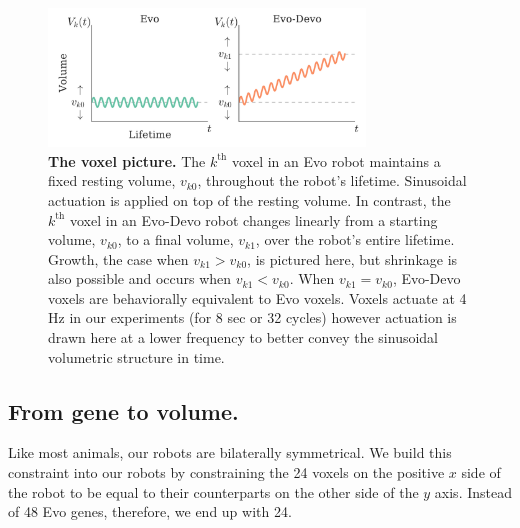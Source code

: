 \begin{figure}
\centering
\includegraphics[width=0.75\textwidth]{Chapter03/img/high_res_illustrations_gecco}
\caption{\label{fig:illustrations} \textbf{The voxel picture.} The $k^{\text{th}}$ voxel in an Evo robot maintains a fixed resting volume, $v_{k0}$, throughout the robot's lifetime. Sinusoidal actuation is applied on top of the resting volume. In contrast, the $k^{\text{th}}$ voxel in an Evo-Devo robot changes linearly from a starting volume, $v_{k0}$, to a final volume, $v_{k1}$, over the robot's entire lifetime. Growth, the case when $v_{k1}>v_{k0}$, is pictured here, but shrinkage is also possible and occurs when $v_{k1}<v_{k0}$. 
When $v_{k1}=v_{k0}$, Evo-Devo voxels are behaviorally equivalent to Evo voxels. 
Voxels actuate at 4 Hz in our experiments (for 8 sec or 32 cycles) however actuation is drawn here at a lower frequency to better convey the sinusoidal volumetric structure in time.}
\end{figure}



\subsection{From gene to volume.}

Like most animals, our robots are bilaterally symmetrical.
We build this constraint into our robots by constraining the 24 voxels on the positive $x$ side of the robot to be equal to their counterparts on the other side of the $y$ axis.
Instead of 48 Evo genes, therefore, we end up with 24.


